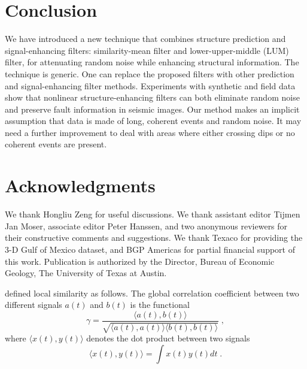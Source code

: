 
 \section{Conclusion}

We have introduced a new technique that combines structure prediction
and signal-enhancing filters: similarity-mean filter and
lower-upper-middle (LUM) filter, for attenuating random noise while
enhancing structural information. The technique is generic. One can
replace the proposed filters with other prediction and
signal-enhancing filter methods. Experiments with synthetic and field
data show that nonlinear structure-enhancing filters can both
eliminate random noise and preserve fault information in seismic
images. Our method makes an implicit assumption that data is made of
long, coherent events and random noise. It may need a further
improvement to deal with areas where either crossing dips or no
coherent events are present.

\section{Acknowledgments}

We thank Hongliu Zeng for useful discussions. We thank assistant
editor Tijmen Jan Moser, associate editor Peter Hanssen, and two
anonymous reviewers for their constructive comments and
suggestions. We thank Texaco for providing the 3-D Gulf of Mexico
dataset, and BGP Americas for partial financial support of this
work. Publication is authorized by the Director, Bureau of Economic
Geology, The University of Texas at Austin.


\cite{Fomel07a} defined local similarity as follows. The global 
correlation coefficient between two different signals $a(t)$ and
$b(t)$ is the functional
\begin{equation}
  \label{eq:sweight1}
     \gamma = \frac {\langle a(t),b(t)\rangle}{\sqrt{\langle a(t),a(t)\rangle \langle b(t),b(t)\rangle}}\;,
\end{equation} 
where $\langle x(t),y(t)\rangle$ denotes the dot product between two signals
\begin{equation}
  \label{eq:sweight2}
     \langle x(t),y(t)\rangle = \int x(t)y(t)dt\;.
\end{equation} 

